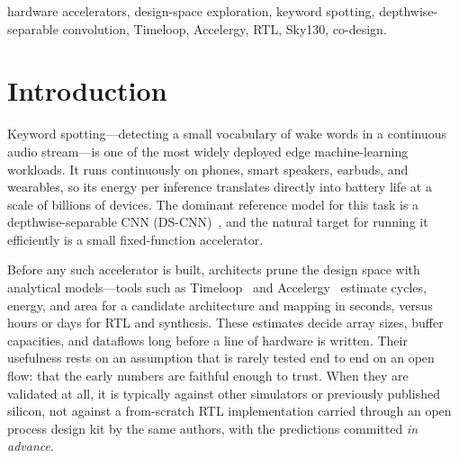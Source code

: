 \documentclass[conference]{IEEEtran}
\newcommand{\x}{\ensuremath{\times}}
\newcommand{\approxs}{\ensuremath{\sim}}
\begin{document}
\begin{abstract}
real sign-off---multi-corner, then post-route---reveals more of the clock
optimism. Along the way we correct a common depthwise-modeling pitfall that
over-counts MACs by \approxs$64\x$ and inflates the ``depthwise starves the
array'' narrative, and we quantify two energy levers: depthwise/pointwise
fusion ($-23\%$) and int8$\rightarrow$int4 precision ($-50\%$ energy for under a $1$-point
top-1 accuracy loss once the 4-bit weights are fine-tuned). Finally, a
synthesizable multi-layer sequencer runs the \emph{complete} ten-layer DS-CNN
end-to-end in hardware---no software scheduling---bit-exact against a
static-quantized golden and at \approxs$91\%$ top-1 on real speech, retiring the
usual ``the accelerator only does the matmuls'' caveat; after banking its
datapath to Block RAM and time-multiplexing one array and one requant lane across
the layer engines, the whole sequencer places and routes on an ECP5-85 FPGA. The
entire flow is open-source and reproducible.
\end{abstract}

\begin{IEEEkeywords}
hardware accelerators, design-space exploration, keyword spotting,
depthwise-separable convolution, Timeloop, Accelergy, RTL, Sky130, co-design.
\end{IEEEkeywords}

\section{Introduction}
Keyword spotting---detecting a small vocabulary of wake words in a continuous
audio stream---is one of the most widely deployed edge machine-learning
workloads. It runs continuously on phones, smart speakers, earbuds, and
wearables, so its energy per inference translates directly into battery life at
a scale of billions of devices. The dominant reference model for this task is a
depthwise-separable CNN (DS-CNN)~\cite{helloedge,mlperftiny}, and the natural
target for running it efficiently is a small fixed-function accelerator.

Before any such accelerator is built, architects prune the design space with
analytical models---tools such as Timeloop~\cite{timeloop} and
Accelergy~\cite{accelergy} estimate cycles, energy, and area for a candidate
architecture and mapping in seconds, versus hours or days for RTL and synthesis.
These estimates decide array sizes, buffer capacities, and dataflows long before
a line of hardware is written. Their usefulness rests on an assumption that is
rarely tested end to end on an open flow: that the early numbers are faithful
enough to trust. When they are validated at all, it is typically against other
simulators or previously published silicon, not against a from-scratch RTL
implementation carried through an open process design kit by the same authors,
with the predictions committed \emph{in advance}.
\end{document}
